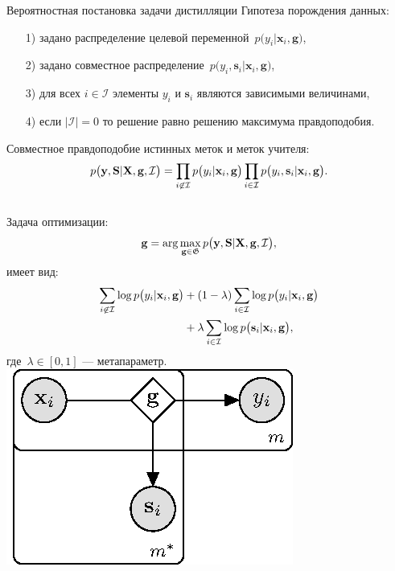 \documentclass[10pt,pdf,hyperref={unicode}]{beamer}
\begin{document}
\begin{frame}{Вероятностная постановка задачи дистилляции}
\justifying
Гипотеза порождения данных:
\begin{enumerate}
	\item[1)] задано распределение целевой переменной~$p\bigr(y_i|\mathbf{x}_i, \mathbf{g}\bigr)$,
	\item[2)] задано совместное распределение~$p\bigr(y_i, \mathbf{s}_i|\mathbf{x}_i, \mathbf{g}\bigr)$,
	\item[3)] для всех $i \in \mathcal{I}$ элементы $y_i$ и $\mathbf{s}_i$ являются зависимыми величинами,
	\item[4)] если $|\mathcal{I}|=0$ то решение равно решению максимума правдоподобия.
\end{enumerate}
Совместное правдоподобие истинных меток и меток учителя:
\[
\setlength\abovedisplayskip{0pt}
p\bigr(\mathbf{y}, \mathbf{S}|\mathbf{X}, \mathbf{g}, \mathcal{I}\bigr)=\prod_{i\not\in \mathcal{I}}p\bigr(y_i|\mathbf{x}_i, \mathbf{g}\bigr)\prod_{i\in \mathcal{I}}p\bigr(y_i, \mathbf{s}_i|\mathbf{x}_i, \mathbf{g}\bigr).
\setlength\belowdisplayskip{0pt}
\]

\begin{columns}
Задача оптимизации:
\[
\setlength\abovedisplayskip{0pt}
\mathbf{g} = \arg\max_{\mathbf{g} \in \mathfrak{G}} p\bigr(\mathbf{y}, \mathbf{S}|\mathbf{X}, \mathbf{g}, \mathcal{I}\bigr),
\setlength\belowdisplayskip{0pt}
\]
имеет вид:
\[
\setlength\abovedisplayskip{0pt}
\begin{aligned}
\sum_{i\not\in \mathcal{I}}\log p\bigr(y_i|\mathbf{x}_i, \mathbf{g}\bigr) &+ \left(1-\lambda\right)\sum_{i\in \mathcal{I}}\log p\bigr(y_i|\mathbf{x}_i, \mathbf{g}\bigr) \\
&+ \lambda\sum_{i\in \mathcal{I}}\log p\bigr(\mathbf{s}_i|\mathbf{x}_i, \mathbf{g}\bigr),
\end{aligned}
\setlength\belowdisplayskip{0pt}
\]
где~$\lambda \in [0,1]$ --- метапараметр.
\includegraphics[width=\textwidth]{figures/proba_model}
\end{columns}

\end{frame}
\end{document}
